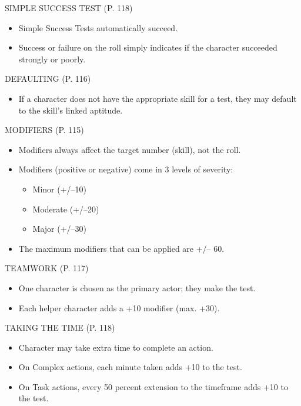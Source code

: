SIMPLE SUCCESS TEST (P. 118)

\begin{itemize}
\item Simple Success Tests automatically succeed.
\item Success or failure on the roll simply indicates if the character
  succeeded strongly or poorly.
\end{itemize}

DEFAULTING (P. 116)

\begin{itemize}
\item If a character does not have the appropriate skill for a test,
  they may default to the skill’s linked aptitude.
\end{itemize}

MODIFIERS (P. 115)

\begin{itemize}
\item Modifiers always affect the target number (skill), not the roll.
\item Modifiers (positive or negative) come in 3 levels of severity:
  \begin{itemize}
  \item Minor (+/–10)
  \item Moderate (+/–20)
  \item Major (+/–30)
  \end{itemize}
\item The maximum modifiers that can be applied are +/– 60.
\end{itemize}

TEAMWORK (P. 117)

\begin{itemize}
\item One character is chosen as the primary actor; they make the
  test.
\item Each helper character adds a +10 modifier (max. +30).
\end{itemize}

TAKING THE TIME (P. 118)

\begin{itemize}
\item Character may take extra time to complete an action.
\item On Complex actions, each minute taken adds +10 to the test.
\item On Task actions, every 50 percent extension to the timeframe
  adds +10 to the test.
\end{itemize}

